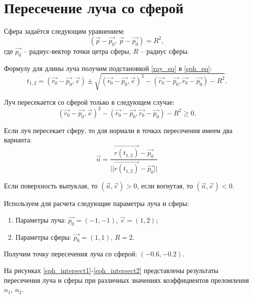 \section{Пересечение луча со сферой}
{
	Сфера задаётся следующим уравнением:
	\begin{equation}\label{sph_eq}
		(\vec{p} - \vec{p_0},\, \vec{p} - \vec{p_0}) = R^2,
	\end{equation}
	где $\vec{p_0}$ -- радиус-вектор точки цетра сферы, $R$ -- радиус сферы.
	
	Формулу для длины луча получим подстановкой \eqref{ray_eq} в \eqref{sph_eq}:
	\begin{equation}\label{ray_sphere_intersect}
	t_{1,2} = (\vec{r_0} - \vec{p_0}, \vec{e}) \pm \sqrt{(\vec{r_0} - \vec{p_0}, \vec{e})^2 - (\vec{r_0} - \vec{p_0}, \vec{r_0} - \vec{p_0}) - R^2}.
	\end{equation}
	
	Луч пересекается со сферой только в следующем случае:
	\begin{equation}\label{sph_intersect_criteria}
	(\vec{r_0} - \vec{p_0}, \vec{e})^2 - (\vec{r_0} - \vec{p_0}, \vec{r_0} - \vec{p_0}) - R^2 \geq 0.
	\end{equation}
	
	Если луч пересекает сферу, то для нормали в точках пересечения имеем два варианта:
	\begin{equation}\label{sph_normal}
	\vec{n} = \frac{\vec{r(t_{1,2})} - \vec{p_0}}{||\vec{r(t_{1,2})} - \vec{p_0}||}
	\end{equation}
	
	Если поверхность выпуклая, то $(\vec{n}, \vec{e}) > 0$, если вогнутая, то $(\vec{n}, \vec{e}) < 0$.
	
	Используем для расчета следующие параметры луча и сферы:
	\begin{enumerate}
	\item Параметры луча: $\vec{p_0} = (-1, -1)$, $\vec{e} = (1, 2)$;
	\item Параметры сферы: $\vec{p_0} = (1, 1)$, $R = 2$.
	\end{enumerate}
	
	Получим точку пересечения луча со сферой: $(-0.6, -0.2)$.
	
	
	На рисунках \ref{sph_intersect1}-\ref{sph_intersect2} представлены результаты пересечения луча и сферы при различных значениях коэффициентов преломления $n_1$, $n_2$.
	
}

